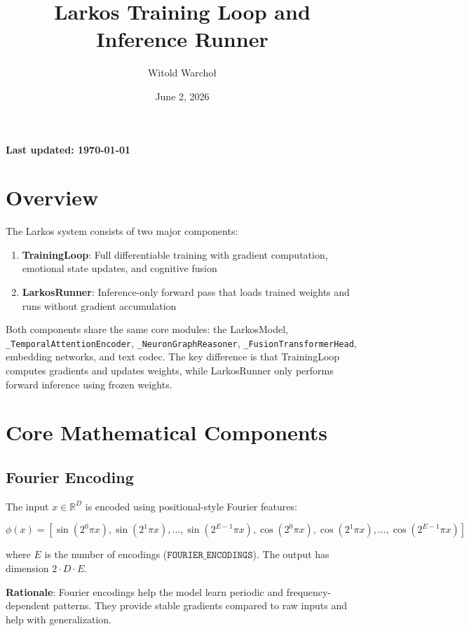 \documentclass[12pt]{article}
\title{Larkos Training Loop and Inference Runner}
\author{Witold Warcho\l{}}
\date{June 2, 2026}
\begin{document}
\maketitle

\textbf{Last updated: \today}

\section{Overview}

The Larkos system consists of two major components:

\begin{enumerate}
  \item \textbf{TrainingLoop}: Full differentiable training with gradient
    computation, emotional state updates, and cognitive fusion
  \item \textbf{LarkosRunner}: Inference-only forward pass that loads
    trained weights and runs without gradient accumulation
\end{enumerate}

Both components share the same core modules: the LarkosModel,
\texttt{\_TemporalAttentionEncoder}, \texttt{\_NeuronGraphReasoner},
\texttt{\_FusionTransformerHead}, embedding networks, and text codec. The
key difference is that TrainingLoop computes gradients and updates weights,
while LarkosRunner only performs forward inference using frozen weights.

\section{Core Mathematical Components}

\subsection{Fourier Encoding}

The input $x \in \mathbb{R}^D$ is encoded using positional-style Fourier
features:

\[
  \phi(x) = \left[ \sin(2^0 \pi x), \sin(2^1 \pi x), \ldots,
    \sin(2^{E-1} \pi x), \cos(2^0 \pi x), \cos(2^1 \pi x), \ldots,
    \cos(2^{E-1} \pi x) \right]
\]

where $E$ is the number of encodings ($\texttt{FOURIER\_ENCODINGS}$). The
output has dimension $2 \cdot D \cdot E$.

\textbf{Rationale}: Fourier encodings help the model learn periodic and
frequency-dependent patterns. They provide stable gradients compared to
raw inputs and help with generalization.
\end{document}
